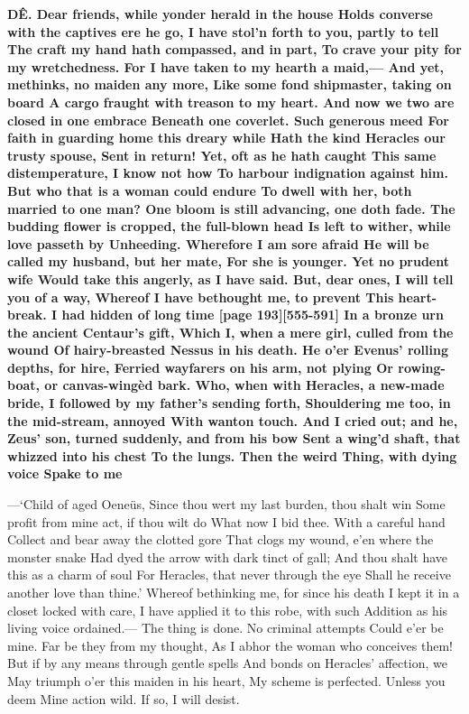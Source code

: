 \documentclass[11pt,letter]{book}
\begin{document}
\par \textbf{DÊ. Dear friends, while yonder herald in the house Holds converse with the captives ere he go, I have stol’n forth to you, partly to tell The craft my hand hath compassed, and in part, To crave your pity for my wretchedness. For I have taken to my hearth a maid,— And yet, methinks, no maiden any more, Like some fond shipmaster, taking on board A cargo fraught with treason to my heart. And now we two are closed in one embrace Beneath one coverlet. Such generous meed For faith in guarding home this dreary while Hath the kind Heracles our trusty spouse, Sent in return! Yet, oft as he hath caught This same distemperature, I know not how To harbour indignation against him. But who that is a woman could endure To dwell with her, both married to one man? One bloom is still advancing, one doth fade. The budding flower is cropped, the full-blown head Is left to wither, while love passeth by Unheeding. Wherefore I am sore afraid He will be called my husband, but her mate, For she is younger. Yet no prudent wife Would take this angerly, as I have said. But, dear ones, I will tell you of a way, Whereof I have bethought me, to prevent This heart-break. I had hidden of long time [page 193][555-591] In a bronze urn the ancient Centaur’s gift, Which I, when a mere girl, culled from the wound Of hairy-breasted Nessus in his death. He o’er Evenus’ rolling depths, for hire, Ferried wayfarers on his arm, not plying Or rowing-boat, or canvas-wingèd bark. Who, when with Heracles, a new-made bride, I followed by my father’s sending forth, Shouldering me too, in the mid-stream, annoyed With wanton touch. And I cried out; and he, Zeus’ son, turned suddenly, and from his bow Sent a wing’d shaft, that whizzed into his chest To the lungs. Then the weird Thing, with dying voice Spake to me}
\par  —‘Child of aged Oeneüs, Since thou wert my last burden, thou shalt win Some profit from mine act, if thou wilt do What now I bid thee. With a careful hand Collect and bear away the clotted gore That clogs my wound, e’en where the monster snake Had dyed the arrow with dark tinct of gall; And thou shalt have this as a charm of soul For Heracles, that never through the eye Shall he receive another love than thine.’ Whereof bethinking me, for since his death I kept it in a closet locked with care, I have applied it to this robe, with such Addition as his living voice ordained.— The thing is done. No criminal attempts Could e’er be mine. Far be they from my thought, As I abhor the woman who conceives them! But if by any means through gentle spells And bonds on Heracles’ affection, we May triumph o’er this maiden in his heart, My scheme is perfected. Unless you deem Mine action wild. If so, I will desist.
\end{document}
